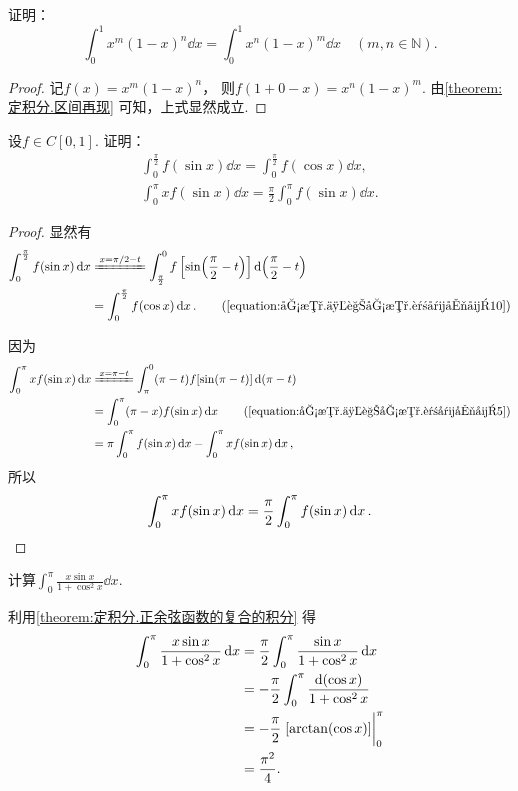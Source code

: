 \begin{example}
证明：\begin{equation}
	\int_0^1 x^m (1-x)^n \dd{x}
	= \int_0^1 x^n (1-x)^m \dd{x}
	\quad(m,n\in\mathbb{N}).
\end{equation}
\begin{proof}
记\(f(x) = x^m (1-x)^n\)，
则\(f(1+0-x) = x^n (1-x)^m\).
由\cref{theorem:定积分.区间再现} 可知，上式显然成立.
\end{proof}
\end{example}

\begin{proposition}\label{theorem:定积分.正余弦函数的复合的积分}
设\(f \in C[0,1]\).
证明：\begin{gather}
	\int_0^{\frac\pi2} f(\sin x) \dd{x}
	= \int_0^{\frac\pi2} f(\cos x) \dd{x}, \\
	\int_0^\pi x f(\sin x) \dd{x}
	= \frac{\pi}{2} \int_0^\pi f(\sin x) \dd{x}.
\end{gather}
\begin{proof}
显然有\begin{align*}
	\int_0^{\frac\pi2} f(\sin x) \dd{x}
	&\xlongequal{x = \pi/2-t}
		\int_{\frac\pi2}^0 f\left[\sin(\frac{\pi}{2}-t)\right] \dd(\frac{\pi}{2}-t) \\
	&= \int_0^{\frac\pi2} f(\cos x) \dd{x}.
		\tag{\cref{equation:函数.三角函数.诱导公式10}}
\end{align*}

因为\begin{align*}
	\int_0^\pi x f(\sin x) \dd{x}
	&\xlongequal{x = \pi-t}
		\int_{\pi}^0 (\pi-t) f[\sin(\pi-t)] \dd(\pi-t) \\
	&= \int_0^\pi (\pi-x) f(\sin x) \dd{x}
		\tag{\cref{equation:函数.三角函数.诱导公式5}} \\
	&= \pi \int_0^\pi f(\sin x) \dd{x}
		- \int_0^\pi x f(\sin x) \dd{x},
\end{align*}
所以\[
	\int_0^\pi x f(\sin x) \dd{x}
	= \frac{\pi}{2} \int_0^\pi f(\sin x) \dd{x}.
	\qedhere
\]
\end{proof}
\end{proposition}

\begin{example}
计算\(\int_0^\pi \frac{x \sin x}{1 + \cos^2 x} \dd{x}\).
\begin{solution}
利用\cref{theorem:定积分.正余弦函数的复合的积分} 得\begin{align*}
	\int_0^\pi \frac{x \sin x}{1 + \cos^2 x} \dd{x}
	&= \frac\pi2 \int_0^\pi \frac{\sin x}{1 + \cos^2 x} \dd{x} \\
	&= -\frac\pi2 \int_0^\pi \frac{\dd(\cos x)}{1 + \cos^2 x} \\
	&= -\frac\pi2 \eval{[\arctan(\cos x)]}_0^\pi \\
	&= \frac{\pi^2}4.
\end{align*}
\end{solution}
\end{example}

